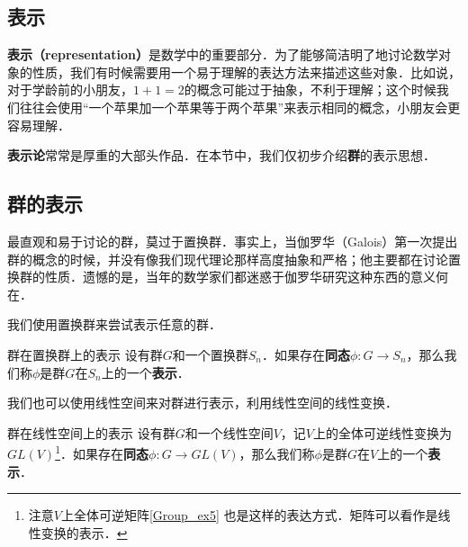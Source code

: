 
\subsection{表示}

\textbf{表示（representation）}是数学中的重要部分．为了能够简洁明了地讨论数学对象的性质，我们有时候需要用一个易于理解的表达方法来描述这些对象．比如说，对于学龄前的小朋友，$1+1=2$的概念可能过于抽象，不利于理解；这个时候我们往往会使用“一个苹果加一个苹果等于两个苹果”来表示相同的概念，小朋友会更容易理解．

\textbf{表示论}常常是厚重的大部头作品．在本节中，我们仅初步介绍\textbf{群}的表示思想．

\subsection{群的表示}

最直观和易于讨论的群，莫过于置换群．事实上，当伽罗华（Galois）第一次提出群的概念的时候，并没有像我们现代理论那样高度抽象和严格；他主要都在讨论置换群的性质．遗憾的是，当年的数学家们都迷惑于伽罗华研究这种东西的意义何在．

我们使用置换群来尝试表示任意的群．

\begin{definition}{群在置换群上的表示}
设有群$G$和一个置换群$S_n$．如果存在\textbf{同态}$\phi: G\rightarrow S_n$，那么我们称$\phi$是群$G$在$S_n$上的一个\textbf{表示}．
\end{definition}

我们也可以使用线性空间来对群进行表示，利用线性空间的线性变换．

\begin{definition}{群在线性空间上的表示}
设有群$G$和一个线性空间$V$，记$V$上的全体可逆线性变换为$GL(V)$\footnote{注意$V$上全体可逆矩阵\autoref{Group_ex5} 也是这样的表达方式．矩阵可以看作是线性变换的表示．}．如果存在\textbf{同态}$\phi: G\rightarrow GL(V)$，那么我们称$\phi$是群$G$在$V$上的一个\textbf{表示}．
\end{definition}